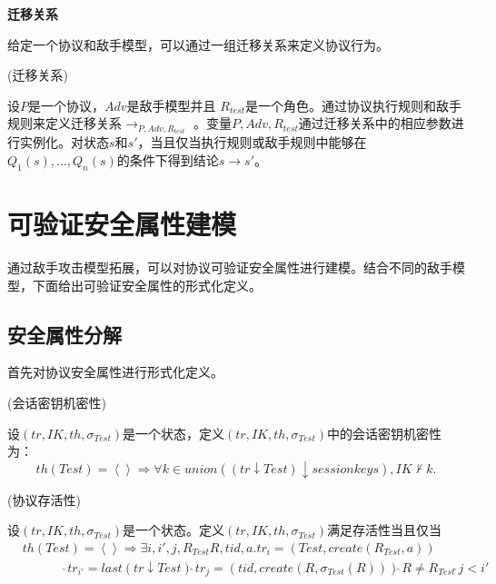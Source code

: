 \textbf{迁移关系}

	给定一个协议和敌手模型，可以通过一组迁移关系来定义协议行为。
	\begin{definition}{(迁移关系)}


	设$P$是一个协议，$Adv$是敌手模型并且 $R_{test}$是一个角色。通过协议执行规则和敌手规则来定义迁移关系$\rightarrow_{P,Adv,R_{test}}$ 。变量$P,Adv,R_{test}$通过迁移关系中的相应参数进行实例化。对状态$s$和$s'$，当且仅当执行规则或敌手规则中能够在$Q_1(s),\ldots,Q_n(s)$的条件下得到结论$s\rightarrow s'$。
\end{definition}


\section{可验证安全属性建模}
	通过敌手攻击模型拓展，可以对协议可验证安全属性进行建模。结合不同的敌手模型，下面给出可验证安全属性的形式化定义。




\subsection{安全属性分解}
首先对协议安全属性进行形式化定义。


		\begin{definition}{(会话密钥机密性)}


	设$\left( tr,IK,th,{{\sigma }_{Test}} \right)$是一个状态，定义$\left( tr,IK,th,{{\sigma }_{Test}} \right)$中的会话密钥机密性为：
	\[th\left( Test \right)=\left\langle {} \right\rangle \Rightarrow \forall k\in union\left( \left( tr\downarrow Test \right)\downarrow sessionkeys \right),IK\nvdash k.\]
	\end{definition}

	\begin{definition}{(协议存活性)}


	设$\left( tr,IK,th,{{\sigma }_{Test}} \right)$是一个状态。定义$\left( tr,IK,th,{{\sigma }_{Test}} \right)$满足存活性当且仅当
	\[\begin{aligned}
  & th\left( Test \right)=\left\langle {} \right\rangle \Rightarrow \exists i,i',j,{{R}_{Test}}R,tid,a.t{{r}_{i}}=\left( Test,create\left( {{R}_{Test}},a \right) \right) \\
 & \ \ \ \ \ \ \ \ \ \ \ \ \ \ \ \hat{\ }t{{r}_{i'}}=last\left( tr\downarrow Test \right)\hat{\ }t{{r}_{j}}=\left( tid,create\left( R,{{\sigma }_{Test}}(R) \right) \right)\hat{\ }R\ne {{R}_{Test}}\hat{\ }j<i' \\
\end{aligned}\]
\end{definition}

